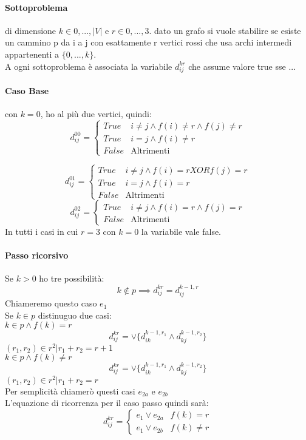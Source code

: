 \documentclass[12pt, a4paper, openany]{book}
\begin{document}
\paragraph*{Sottoproblema} di dimensione $k\in {0,...,|V|}$ e $r\in {0,...,3}$.
dato un grafo si vuole stabilire se esiste un cammino p da i a j con esattamente r vertici rossi che usa 
archi intermedi appartenenti a $\{0,...,k\}$.
\\A ogni sottoproblema è associata la variabile $d_{ij}^{kr}$ che assume valore true sse ...

\paragraph*{Caso Base} con $k=0$, ho al più due vertici, quindi:
$$d_{ij}^{00} = \begin{cases}
	True & i\neq j \wedge f(i)\neq r \wedge f(j)\neq r\\
	True & i = j \wedge f(i)\neq r\\
	False & \text{Altrimenti} 
\end{cases}
$$

$$d_{ij}^{01} = \begin{cases}
	True & i\neq j \wedge f(i) = r XOR f(j) = r\\
	True & i = j \wedge f(i) =  r\\
	False & \text{Altrimenti} 
\end{cases}
$$
$$d_{ij}^{02} = \begin{cases}
	True & i\neq j \wedge f(i)= r \wedge f(j)= r\\
	False & \text{Altrimenti} 
\end{cases}
$$
In tutti i casi in cui $r = 3$ con $k=0$ la variabile vale false.

\paragraph*{Passo ricorsivo}
Se $k>0$ ho tre possibilità:
\\$$k\notin p \implies d_{ij}^{kr} = d_{ij}^{k-1,r}$$
Chiameremo questo caso $e_1$
\\Se $k\in p$ distinuguo due casi:
\\$k\in p \wedge f(k)= r$
$$d_{ij}^{kr} = \vee \{d_{ik}^{k-1,r_1} \wedge d_{kj}^{k-1,r_2}\}$$
$(r_1,r_2) \in r^2 | r_1+r_2 = r+1$
\\$k\in p \wedge f(k)\neq r$
$$d_{ij}^{kr} = \vee \{d_{ik}^{k-1,r_1} \wedge d_{kj}^{k-1,r_2}\}$$
$(r_1,r_2) \in r^2 | r_1+r_2 = r$
\\Per semplicità chiamerò questi casi $e_{2a}$ e $e_{2b}$
\\L'equazione di ricorrenza per il caso passo quindi sarà:
$$d_{ij}^{kr} = \begin{cases}
	e_1 \vee e_{2a} & f(k)=r\\
	e_1 \vee e_{2b} & f(k)\neq r
\end{cases}
$$
\end{document}
